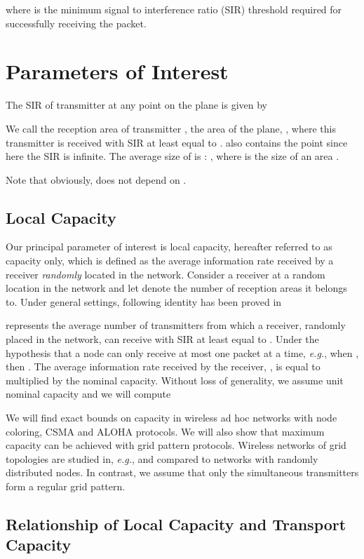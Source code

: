 \documentclass[12pt,english]{article}
\begin{document}
where  is the minimum signal to interference ratio (SIR) threshold required for successfully receiving the packet. 

\section{Parameters of Interest}

The SIR of transmitter  at any point  on the plane is given by
 

We call the reception area of transmitter , the area of the plane, , where this transmitter is received with SIR at least equal to .  also contains the point  since here the SIR is infinite. The average size of  is : , where  is the size of an area . 

Note that obviously,  does not depend on .

\subsection{Local Capacity}

Our principal parameter of interest is local capacity, hereafter referred to as capacity only, which is defined as the average information rate received by a receiver {\em randomly} located in the network. Consider a receiver at a random location  in the network and let  denote the number of reception areas it belongs to. Under general settings, following identity has been proved in \cite{Jacquet:2009}

 represents the average number of transmitters from which a receiver, randomly placed in the network, can receive with SIR at least equal to . Under the hypothesis that a node can only receive at most one packet at a time, {\it e.g.}, when \mbox{}, then \mbox{}. The average information rate received by the receiver, , is equal to  multiplied by the nominal capacity. Without loss of generality, we assume unit nominal capacity and we will compute 


We will find exact bounds on capacity in wireless ad hoc networks with node coloring, CSMA and ALOHA protocols. We will also show that maximum capacity can be achieved with grid pattern protocols. Wireless networks of grid topologies are studied in, {\it e.g.}, \cite{Liu:Haenggi,Hong:Hua} and compared to networks with randomly distributed nodes. In contrast, we assume that only the simultaneous transmitters form a regular grid pattern. 

\subsection{Relationship of Local Capacity and Transport Capacity}
\end{document}
